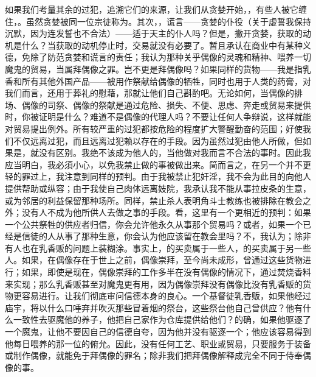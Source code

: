 如果我们考量其余的过犯，追溯它们的来源，让我们从贪婪开始，，有些人被它缠住，。虽然贪婪被同一位宗徒称为。其次，，谎言——贪婪的仆役（关于虚誓我保持沉默，因为连发誓也不合法）——适于天主的仆人吗？但是，撇开贪婪，获取的动机是什么？当获取的动机停止时，交易就没有必要了。暂且承认在商业中有某种义德，免除了防范贪婪和谎言的责任；我认为那种关乎偶像的灵魂和精神、喂养一切魔鬼的贸易，当属拜偶像之罪。岂不更是拜偶像吗？如果同样的货物——我是指乳香和所有其他外国产品——被用作祭献给偶像的牺牲，同时也用于人类的药膏，对我们而言，还用于葬礼的慰藉，那就让他们自己斟酌吧。无论如何，当偶像的排场、偶像的司祭、偶像的祭献是通过危险、损失、不便、思虑、奔走或贸易来提供时，你被证明是什么？难道不是偶像的代理人吗？不要让任何人争辩说，这样就能对贸易提出例外。所有较严重的过犯都按危险的程度扩大警醒勤奋的范围；好使我们不仅远离过犯，而且远离过犯赖以存在的手段。因为虽然过犯由他人所做，但如果是，就没有区别。我绝不该成为他人的，当他做对我而言不合法的事时。因此我应当明白，我必須小心，以免我禁止做的事被做出来。简而言之，在另一个并不更轻的罪过上，我注意到同样的预判。由于我被禁止犯奸淫，我不会为此目的向他人提供帮助或纵容；由于我使自己肉体远离妓院，我承认我不能从事拉皮条的生意，或为邻居的利益保留那种场所。同样，禁止杀人表明角斗士教练也被排除在教会之外；没有人不成为他所供人去做之事的手段。看，这里有一个更相近的预判：如果一个公共祭牲的供应者归信，你会允许他永久从事那个贸易吗？或者，如果一个已经是信徒的人从事了那种生意，你会认为他应该留在教会里吗？不，我认为；除非有人也在乳香贩的问题上装糊涂。事实上，的买卖属于一些人，的买卖属于另一些人。如果，在偶像存在于世上之前，偶像崇拜，至今尚未成形，曾通过这些货物进行；如果，即使是现在，偶像崇拜的工作多半在没有偶像的情况下，通过焚烧香料来实现；那么乳香贩甚至对魔鬼更有用，因为偶像崇拜没有偶像比没有乳香贩的货物更容易进行。让我们彻底审问信德本身的良心。一个基督徒乳香贩，如果他经过庙宇，将以什么口唾弃并吹灭那些冒着烟的祭台，这些祭台他自己曾供应？他有什么一致性去驱魔他的养子，他把自己家作为仓库提供给他们？的确，如果他驱逐了一个魔鬼，让他不要因自己的信德自夸，因为他并没有驱逐一个；他应该容易得到他每日喂养的那一位的俯允。因此，没有任何工艺、职业或贸易，只要服务于装备或制作偶像，就能免于拜偶像的罪名；除非我们把拜偶像解释成完全不同于侍奉偶像的事。\par



